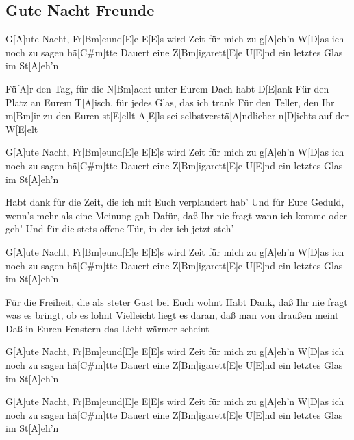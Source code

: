 \subsection*{Gute Nacht Freunde   }
\begin{guitar}
G[A]ute Nacht, Fr[Bm]eund[E]e
E[E]s wird Zeit für mich zu g[A]eh'n
W[D]as ich noch zu sagen hä[C#m]tte
Dauert eine Z[Bm]igarett[E]e
U[E]nd ein letztes Glas im St[A]eh'n

Fü[A]r den Tag, für die N[Bm]acht unter Eurem Dach habt D[E]ank
Für den Platz an Eurem T[A]isch, für jedes Glas, das ich trank
Für den Teller, den Ihr m[Bm]ir zu den Euren st[E]ellt
A[E]ls sei selbstverstä[A]ndlicher n[D]ichts auf der W[E]elt

G[A]ute Nacht, Fr[Bm]eund[E]e
E[E]s wird Zeit für mich zu g[A]eh'n
W[D]as ich noch zu sagen hä[C#m]tte
Dauert eine Z[Bm]igarett[E]e
U[E]nd ein letztes Glas im St[A]eh'n

Habt dank für die Zeit, die ich mit Euch verplaudert hab'
Und für Eure Geduld, wenn's mehr als eine Meinung gab
Dafür, daß Ihr nie fragt wann ich komme oder geh'
Und für die stets offene Tür, in der ich jetzt steh'

G[A]ute Nacht, Fr[Bm]eund[E]e
E[E]s wird Zeit für mich zu g[A]eh'n
W[D]as ich noch zu sagen hä[C#m]tte
Dauert eine Z[Bm]igarett[E]e
U[E]nd ein letztes Glas im St[A]eh'n

Für die Freiheit, die als steter Gast bei Euch wohnt
Habt Dank, daß Ihr nie fragt was es bringt, ob es lohnt
Vielleicht liegt es daran, daß man von draußen meint
Daß in Euren Fenstern das Licht wärmer scheint

G[A]ute Nacht, Fr[Bm]eund[E]e
E[E]s wird Zeit für mich zu g[A]eh'n
W[D]as ich noch zu sagen hä[C#m]tte
Dauert eine Z[Bm]igarett[E]e
U[E]nd ein letztes Glas im St[A]eh'n

G[A]ute Nacht, Fr[Bm]eund[E]e
E[E]s wird Zeit für mich zu g[A]eh'n
W[D]as ich noch zu sagen hä[C#m]tte
Dauert eine Z[Bm]igarett[E]e
U[E]nd ein letztes Glas im St[A]eh'n

\end{guitar}

